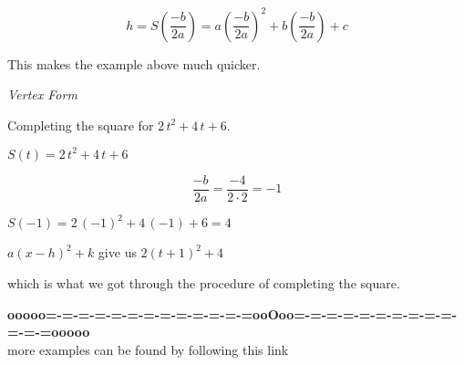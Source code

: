 \documentclass{ximera}
\begin{document}
\[
h = S\left( \frac{-b}{2 a} \right) = a \left( \frac{-b}{2 a} \right)^2 + b \left( \frac{-b}{2 a} \right) + c 
\]







This makes the example above much quicker.





\begin{example} \textit{Vertex Form}



Completing the square for $2 \, t^2 + 4 \, t + 6$.


\begin{explanation}


$S(t) = 2 \, t^2 + 4 \, t + 6$


\[
\frac{-b}{2 a} = \frac{-4}{2 \cdot 2} = -1
\]


$S(-1) = 2 \, (-1)^2 + 4 \, (-1) + 6 = 4$



$a (x - h)^2 + k$ give us $2 (t+1)^2 + 4$

which is what we got through the procedure of completing the square.

\end{explanation}



\end{example}




\begin{center}
\textbf{\textcolor{green!50!black}{ooooo=-=-=-=-=-=-=-=-=-=-=-=-=ooOoo=-=-=-=-=-=-=-=-=-=-=-=-=ooooo}} \\

more examples can be found by following this link\\ 

\end{center}
\end{document}
